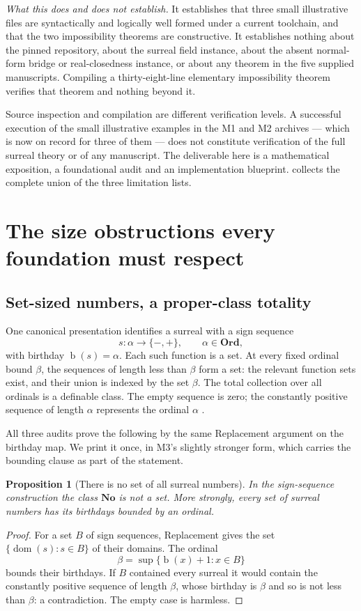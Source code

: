 \documentclass[11pt,letterpaper]{article}
\numberwithin{equation}{section}
\newtheorem{proposition}[theorem]{Proposition}
\theoremstyle{definition}
\theoremstyle{remark}
\newcommand{\No}{\mathbf{No}}
\newcommand{\Ord}{\mathbf{Ord}}
\newcommand{\bd}{\operatorname{b}}
\begin{document}
\emph{What this does and does not establish.} It establishes that three small
illustrative files are syntactically and logically well formed under a current
toolchain, and that the two impossibility theorems are constructive. It
establishes nothing about the pinned repository, about the surreal field
instance, about the absent normal-form bridge or real-closedness instance, or
about any theorem in the five supplied manuscripts. Compiling a
thirty-eight-line elementary impossibility theorem verifies that theorem and
nothing beyond it.

Source inspection and compilation are different verification levels. A
successful execution of the small illustrative examples in the M1 and M2
archives --- which is now on record for three of them --- does not constitute
verification of the full surreal theory or of any manuscript. The deliverable here is a mathematical exposition, a foundational
audit and an implementation blueprint.  collects the
complete union of the three limitation lists.
\section{The size obstructions every foundation must respect}
\label{found:sec:size}

\subsection{Set-sized numbers, a proper-class totality}
\label{found:sub:properness}
One canonical presentation identifies a surreal with a sign sequence
\[
 s:\alpha\longrightarrow\{-,+\},\qquad \alpha\in\Ord,
\]
with birthday $\bd(s)=\alpha$. Each such function is a set. At every fixed
ordinal bound $\beta$, the sequences of length less than $\beta$ form a set:
the relevant function sets exist, and their union is indexed by the set
$\beta$. The total collection over all ordinals is a definable class. The empty
sequence is zero; the constantly positive sequence of length $\alpha$
represents the ordinal $\alpha$ \cite{found:Gonshor,found:Conway}.

All three audits prove the following by the same Replacement argument on the
birthday map. We print it once, in M3's slightly stronger form, which carries
the bounding clause as part of the statement.

\begin{proposition}[There is no set of all surreal numbers]\label{found:prop:proper}
In the sign-sequence construction the class $\No$ is not a set. More strongly,
every \emph{set} of surreal numbers has its birthdays bounded by an ordinal.
\end{proposition}
\begin{proof}
For a set $B$ of sign sequences, Replacement gives the set
$\{\operatorname{dom}(s):s\in B\}$ of their domains. The ordinal
\[
 \beta=\sup\{\bd(x)+1:x\in B\}
\]
bounds their birthdays. If $B$ contained every surreal it would contain the
constantly positive sequence of length $\beta$, whose birthday is $\beta$ and
so is not less than $\beta$: a contradiction. The empty case is harmless.
\end{proof}
\end{document}
